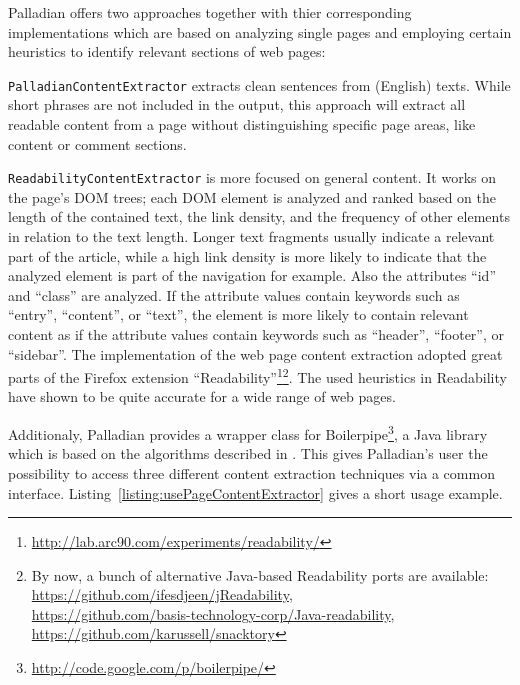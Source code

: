 Palladian offers two approaches together with thier corresponding implementations which are based on analyzing single pages and employing certain heuristics to identify relevant sections of web pages:

\begin{description}
	
	\item \texttt{PalladianContentExtractor} extracts clean sentences from (English) texts. While short phrases are not included in the output, this approach will extract all readable content from a page without distinguishing specific page areas, like content or comment sections.
	
	\item \texttt{ReadabilityContentExtractor} is more focused on general content. It works on the page's DOM trees; each DOM element is analyzed and ranked based on the length of the contained text, the link density, and the frequency of other elements in relation to the text length. Longer text fragments usually indicate a relevant part of the article, while a high link density is more likely to indicate that the analyzed element is part of the navigation for example. Also the attributes ``id'' and ``class'' are analyzed. If the attribute values contain keywords such as ``entry'', ``content'', or ``text'', the element is more likely to contain relevant content as if the attribute values contain keywords such as ``header'', ``footer'', or ``sidebar''. The implementation of the web page content extraction adopted great parts of the Firefox extension ``Readability''\footnote{\url{http://lab.arc90.com/experiments/readability/}}\footnote{By now, a bunch of alternative Java-based Readability ports are available:\\ \url{https://github.com/ifesdjeen/jReadability},\\ \url{https://github.com/basis-technology-corp/Java-readability},\\ \url{https://github.com/karussell/snacktory}}. The used heuristics in Readability have shown to be quite accurate for a wide range of web pages.
	
\end{description}

Additionaly, Palladian provides a wrapper class for Boilerpipe\footnote{\url{http://code.google.com/p/boilerpipe/}}, a Java library which is based on the algorithms described in \cite{BoilerplateDetectionShallowTextFeatures}. This gives Palladian's user the possibility to access three different content extraction techniques via a common interface. Listing~\ref{listing:usePageContentExtractor} gives a short usage example.

